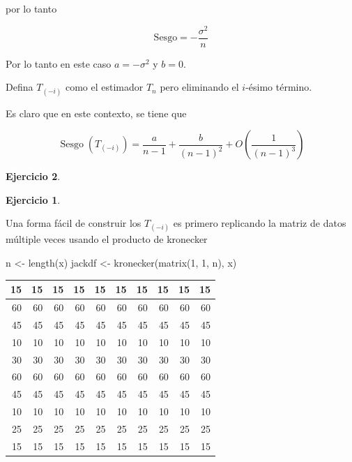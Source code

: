 \documentclass[
  12pt,
]{book}
\newenvironment{Shaded}{\begin{snugshade}}{\end{snugshade}}
\newcommand{\DecValTok}[1]{\textcolor[rgb]{0.00,0.00,0.81}{#1}}
\newcommand{\FunctionTok}[1]{\textcolor[rgb]{0.00,0.00,0.00}{#1}}
\newcommand{\NormalTok}[1]{#1}
\newcommand{\OtherTok}[1]{\textcolor[rgb]{0.56,0.35,0.01}{#1}}
\theoremstyle{definition}
\theoremstyle{definition}
\theoremstyle{definition}
\newtheorem{exercise}{Ejercicio}[chapter]
\theoremstyle{remark}
\begin{document}
por lo tanto

\begin{equation*}
\mathrm{Sesgo} = -\frac{\sigma^{2}}{n}
\end{equation*}

Por lo tanto en este caso \(a=-\sigma^{2}\) y \(b=0\).

Defina \(T_{(-i)}\) como el estimador \(T_{n}\) pero eliminando el
\(i\)-ésimo término.

Es claro que en este contexto, se tiene que

\begin{equation}
\operatorname{Sesgo}\left(T_{(-i)}\right)=\frac{a}{n-1}+\frac{b}{(n-1)^{2}}+O\left(\frac{1}{(n-1)^{3}}\right)
\end{equation}

\begin{exercise}
\begin{exercise}
\protect\hypertarget{exr:unlabeled-div-32}{}\label{exr:unlabeled-div-32}

\protect\hypertarget{exr:unnamed-chunk-67}{}{\label{exr:unnamed-chunk-67} }Una forma fácil de construir los \(T_{(-i)}\) es primero replicando
la matriz de datos múltiple veces usando el producto de kronecker

\end{exercise}
\end{exercise}

\begin{Shaded}
\begin{Highlighting}[]
\NormalTok{n }\OtherTok{\textless{}{-}} \FunctionTok{length}\NormalTok{(x)}
\NormalTok{jackdf }\OtherTok{\textless{}{-}} \FunctionTok{kronecker}\NormalTok{(}\FunctionTok{matrix}\NormalTok{(}\DecValTok{1}\NormalTok{, }\DecValTok{1}\NormalTok{, n), x)}
\end{Highlighting}
\end{Shaded}

\begin{tabular}{r|r|r|r|r|r|r|r|r|r}
\hline
15 & 15 & 15 & 15 & 15 & 15 & 15 & 15 & 15 & 15\\
\hline
60 & 60 & 60 & 60 & 60 & 60 & 60 & 60 & 60 & 60\\
\hline
45 & 45 & 45 & 45 & 45 & 45 & 45 & 45 & 45 & 45\\
\hline
10 & 10 & 10 & 10 & 10 & 10 & 10 & 10 & 10 & 10\\
\hline
30 & 30 & 30 & 30 & 30 & 30 & 30 & 30 & 30 & 30\\
\hline
60 & 60 & 60 & 60 & 60 & 60 & 60 & 60 & 60 & 60\\
\hline
45 & 45 & 45 & 45 & 45 & 45 & 45 & 45 & 45 & 45\\
\hline
10 & 10 & 10 & 10 & 10 & 10 & 10 & 10 & 10 & 10\\
\hline
25 & 25 & 25 & 25 & 25 & 25 & 25 & 25 & 25 & 25\\
\hline
15 & 15 & 15 & 15 & 15 & 15 & 15 & 15 & 15 & 15\\
\hline
\end{tabular}
\end{document}
